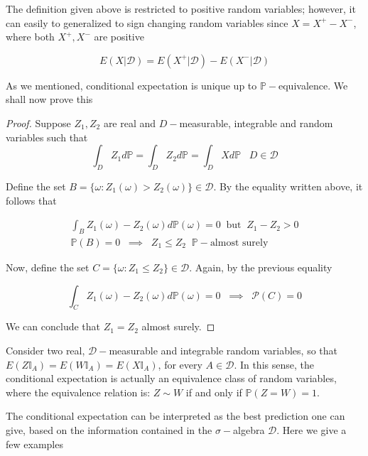 The definition given above is restricted to positive random variables; however, it can easily to generalized to sign changing random variables since $X = X^+-X^-$, where both $X^+,X^-$ are positive

\begin{equation*}
    E(X\vert \mathcal{D}) = E(X^+ \vert \mathcal{D})-E(X^-\vert \mathcal{D})
\end{equation*}

As we mentioned, conditional expectation is unique up to $\mathbb{P}-$equivalence. We shall now prove this
\begin{proof}
    Suppose $Z_1,Z_2$ are real and $D-$measurable, integrable and random variables such that 
    \begin{equation*}
        \int_D Z_1 d\mathbb{P} = \int_D Z_2 d\mathbb{P} = \int_D X d\mathbb{P} \;\;\; D \in \mathcal{D}
    \end{equation*}

Define the set $B = \{ \omega : Z_1(\omega) > Z_2(\omega) \} \in \mathcal{D}$. By the equality written above, it follows that 

\begin{gather*}
    \int_{B} Z_1(\omega)-Z_2(\omega) d\mathbb{P}(\omega) = 0 \;\; \text{but} \;\; Z_1-Z_2 > 0 \\
    \mathbb{P}(B) = 0 \;\; \implies \;\; Z_1 \leq Z_2 \;\; \mathbb{P}-\text{almost surely}
\end{gather*}

Now, define the set $C = \{ \omega : Z_1 \leq Z_2 \} \in \mathcal{D}$. Again, by the previous equality 

\begin{equation*}
    \int_{C} Z_1(\omega) - Z_2(\omega) d\mathbb{P}(\omega) = 0 \;\; \implies \;\; \mathcal{P}(C) = 0
\end{equation*}

We can conclude that $Z_1 = Z_2$ almost surely. 
\end{proof}

Consider two real, $\mathcal{D}-$measurable and integrable random variables, so that $E(Z \mathbb{I}_A) = E(W \mathbb{I}_A) = E(X \mathbb{I}_A)$, for every $A \in \mathcal{D}$. In this sense, the conditional expectation is actually an equivalence class of random variables, where the equivalence relation is: $Z \sim W$ if and only if $\mathbb{P}(Z = W) = 1$. 

The conditional expectation can be interpreted as the best prediction one can give, based on the information contained in the $\sigma-$algebra $\mathcal{D}$. Here we give a few examples 

